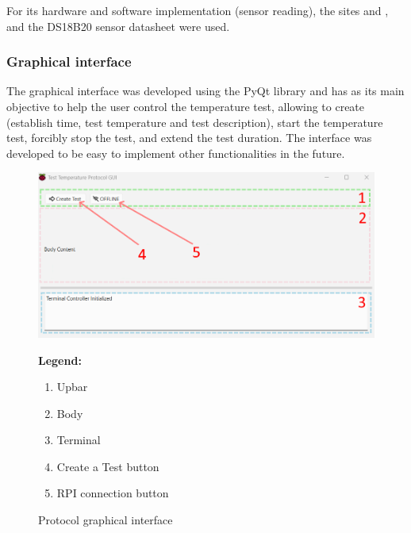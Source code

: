 For its hardware and software implementation (sensor reading), the sites \cite{Brian_Mark_Benoit_Santos_Alessandro_2023} and \cite{Campbell_2025}, and the DS18B20 sensor datasheet \cite{ds_datasheet} were used.

\subsubsection{Graphical interface}

The graphical interface was developed using the PyQt library and has as its main objective to help the user control the temperature test, allowing to create (establish time, test temperature and test description), start the temperature test, forcibly stop the test, and extend the test duration. The interface was developed to be easy to implement other functionalities in the future.

\begin{figure}[H]
    \centering
    \begin{minipage}{0.6\textwidth}
        \includegraphics[width=\linewidth]{figures/gui_1.png}
    \end{minipage}%
    \hfill
    \begin{minipage}{0.35\textwidth}
        \small
        \textbf{Legend:}
        \begin{enumerate}
            \item Upbar
            \item Body
            \item Terminal
            \item Create a Test button
            \item RPI connection button
        \end{enumerate}
    \end{minipage}
    \caption{Protocol graphical interface}
    \label{fig:gui_1}
\end{figure}

